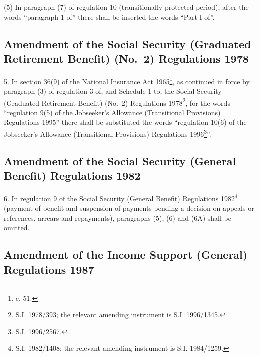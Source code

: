\documentclass[12pt,a4paper]{article}
\begin{document}
(5) In paragraph (7) of regulation 10 (transitionally protected period), after the words “paragraph 1 of” there shall be inserted the words “Part I of”.

\subsection[5. Amendment of the Social Security (Graduated Retirement Benefit) (No.\ 2) Regulations 1978]{Amendment of the Social Security (Graduated Retirement Benefit) (No.\ 2) Regulations 1978}

5.  In section 36(9) of the National Insurance Act 1965\footnote{ c. 51.}, as continued in force by paragraph (3) of regulation 3 of, and Schedule 1 to, the Social Security (Graduated Retirement Benefit) (No.\ 2) Regulations 1978\footnote{\frenchspacing S.I. 1978/393; the relevant amending instrument is S.I. 1996/1345.}, for the words “regulation 9(5) of the Jobseeker’s Allowance (Transitional Provisions) Regulations 1995” there shall be substituted the words “regulation 10(6) of the Jobseeker’s Allowance (Transitional Provisions) Regulations 1996\footnote{\frenchspacing S.I. 1996/2567.}”.

\subsection[6. Amendment of the Social Security (General Benefit) Regulations 1982]{Amendment of the Social Security (General Benefit) Regulations 1982}

6.  In regulation 9 of the Social Security (General Benefit) Regulations 1982\footnote{\frenchspacing S.I. 1982/1408; the relevant amending instrument is S.I. 1984/1259.} (payment of benefit and suspension of payments pending a decision on appeals or references, arrears and repayments), paragraphs (5), (6) and (6A) shall be omitted.

\subsection[7. Amendment of the Income Support (General) Regulations 1987]{Amendment of the Income Support (General) Regulations 1987}
\end{document}

